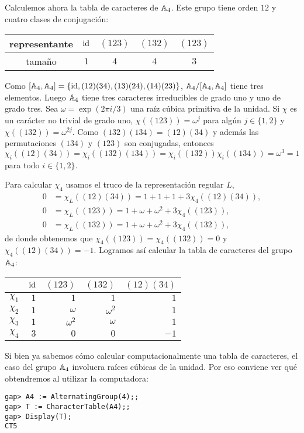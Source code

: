 \begin{example}
	Calculemos ahora la tabla de caracteres de $\mathbb{A}_4$. Este grupo tiene orden $12$ y 
	cuatro clases de conjugación:
	\begin{center}
		\begin{tabular}{c|cccc}
			representante & $\operatorname{id}$ & $(123)$ & $(132)$ & $(123)$\tabularnewline
			\hline
			tamaño & $1$ & $4$ & $4$ & $3$ 
		\end{tabular}
	\end{center}
	Como $[\mathbb{A}_4,\mathbb{A}_4]=\{\operatorname{id},(12)(34),(13)(24),(14)(23)\}$,
	$\mathbb{A}_4/[\mathbb{A}_4,\mathbb{A}_4]$ tiene tres elementos. Luego $\mathbb{A}_4$ tiene tres
	caracteres irreducibles de grado uno y uno de grado tres. Sea
	$\omega=\exp(2\pi i/3)$ una raíz cúbica primitiva de la unidad. Si $\chi$
	es un carácter no trivial de grado uno, $\chi\left( (123) \right)=\omega^j$
	para algún $j\in\{1,2\}$ y $\chi\left( (132) \right)=\omega^{2j}$. Como 
	$(132)(134)=(12)(34)$ y además 
	las permutaciones $(134)$ y $(123)$ son conjugadas, entonces 
	\[
	\chi_i((12)(34))=\chi_i((132)(134))=\chi_i((132))\chi_i((134))=\omega^3=1
	\]
	para todo $i\in\{1,2\}$. 
	
	Para calcular $\chi_4$ usamos el truco de la representación regular $L$, 
	\begin{align*}
		0&=\chi_L\left( (12)(34) \right)=1+1+1+3\chi_4\left( (12)(34) \right),\\
		0&=\chi_L\left( (123) \right)=1+\omega+\omega^2+3\chi_4\left( (123) \right),\\
		0&=\chi_L\left( (132) \right)=1+\omega+\omega^2+3\chi_4\left( (132) \right),
	\end{align*}
	de donde obtenemos que $\chi_4\left( (123) \right)=\chi_4\left( (132)
	\right)=0$ y $\chi_4\left( (12)(34) \right)=-1$. Logramos así calcular la tabla de caracteres del grupo $\mathbb{A}_4$:
	\begin{center}
		\begin{tabular}{|c|rrrr|}
			\hline
			& $\operatorname{id}$ & $(123)$ & $(132)$ & $(12)(34)$\tabularnewline
			\hline
			$\chi_1$ & $1$ & $1$ & $1$ & $1$\tabularnewline
			$\chi_2$ & $1$ & $\omega$ & $\omega^2$ & $1$\tabularnewline
			$\chi_3$ & $1$ & $\omega^2$ & $\omega$ & $1$\tabularnewline
			$\chi_4$ & $3$ & $0$ & $0$ & $-1$\tabularnewline
			\hline
		\end{tabular}
	\end{center}
	Si bien ya sabemos cómo calcular computacionalmente una tabla de caracteres, el caso del grupo $\mathbb{A}_4$ 
	involucra raíces cúbicas de la unidad. Por eso conviene ver qué obtendremos al utilizar la computadora:
\begin{lstlisting}
gap> A4 := AlternatingGroup(4);;
gap> T := CharacterTable(A4);;
gap> Display(T);
CT5


\end{lstlisting}
\end{example}
